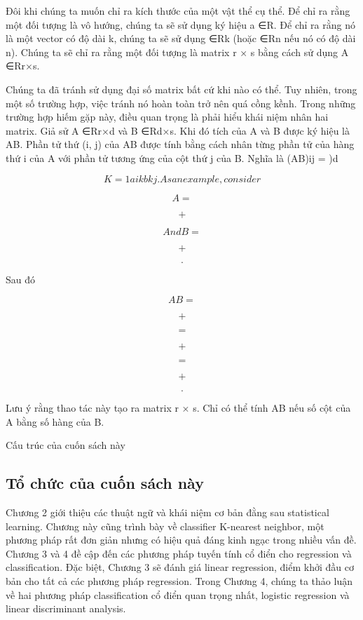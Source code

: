 Đôi khi chúng ta muốn chỉ ra kích thước của một vật thể cụ thể. Để chỉ ra rằng một đối tượng là vô hướng, chúng ta sẽ sử dụng ký hiệu a ∈R. Để chỉ ra rằng nó là một vector có độ dài k, chúng ta sẽ sử dụng ∈Rk (hoặc ∈Rn nếu nó có độ dài n). Chúng ta sẽ chỉ ra rằng một đối tượng là matrix r × s bằng cách sử dụng A ∈Rr×s.

Chúng ta đã tránh sử dụng đại số matrix bất cứ khi nào có thể. Tuy nhiên, trong một số trường hợp, việc tránh nó hoàn toàn trở nên quá cồng kềnh. Trong những trường hợp hiếm gặp này, điều quan trọng là phải hiểu khái niệm nhân hai matrix. Giả sử A ∈Rr×d và B ∈Rd×s. Khi đó tích của A và B được ký hiệu là AB. Phần tử thứ (i, j) của AB được tính bằng cách nhân từng phần tử của hàng thứ i của A với phần tử tương ứng của cột thứ j của B. Nghĩa là (AB)ij = )d

\[K=1 aikbkj. As an example, consider\]

\[A =\]

\[+\]

\[And B =\]

\[+\]

\[.\]

Sau đó

\[AB =\]

\[+\]

\[=\]

\[+\]

\[=\]

\[+\]

\[.\]

Lưu ý rằng thao tác này tạo ra matrix r × s. Chỉ có thể tính AB nếu số cột của A bằng số hàng của B.

Cấu trúc của cuốn sách này

\subsection{Tổ chức của cuốn sách này}

Chương 2 giới thiệu các thuật ngữ và khái niệm cơ bản đằng sau statistical learning. Chương này cũng trình bày về classifier K-nearest neighbor, một phương pháp rất đơn giản nhưng có hiệu quả đáng kinh ngạc trong nhiều vấn đề. Chương 3 và 4 đề cập đến các phương pháp tuyến tính cổ điển cho regression và classification. Đặc biệt, Chương 3 sẽ đánh giá linear regression, điểm khởi đầu cơ bản cho tất cả các phương pháp regression. Trong Chương 4, chúng ta thảo luận về hai phương pháp classification cổ điển quan trọng nhất, logistic regression và linear discriminant analysis.

